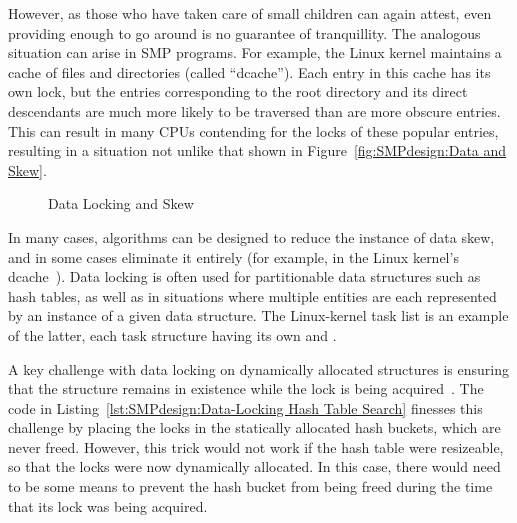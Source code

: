 However, as those who have taken care of small children can again attest,
even providing enough to go around is no guarantee of tranquillity.
The analogous situation can arise in SMP programs.
For example, the Linux kernel maintains a cache of files and directories
(called ``dcache'').
Each entry in this cache has its own lock, but the entries corresponding
to the root directory and its direct descendants are much more likely to
be traversed than are more obscure entries.
This can result in many CPUs contending for the locks of these popular
entries, resulting in a situation not unlike that
shown in Figure~\ref{fig:SMPdesign:Data and Skew}.

\begin{figure}
\centering
{}
\caption{Data Locking and Skew}
\end{figure}

In many cases, algorithms can be designed to reduce the instance of
data skew, and in some cases eliminate it entirely
(for example, in the Linux kernel's
dcache~\cite{McKenney04a,JonathanCorbet2010dcacheRCU,NeilBrown2015PathnameLookup,NeilBrown2015RCUwalk,NeilBrown2015PathnameSymlinks}).
Data locking is often used for partitionable data structures such as
hash tables, as well as in situations where multiple entities are each
represented by an instance of a given data structure.
The Linux-kernel task list is an example of the latter, each task
structure having its own  and .

A key challenge with data locking on dynamically allocated structures
is ensuring that the structure remains in existence while the lock is
being acquired~\cite{Gamsa99}.
The code in
Listing~\ref{lst:SMPdesign:Data-Locking Hash Table Search}
finesses this challenge by placing the locks in the statically allocated
hash buckets, which are never freed.
However, this trick would not work if the hash table were resizeable,
so that the locks were now dynamically allocated.
In this case, there would need to be some means to prevent the hash
bucket from being freed during the time that its lock was being acquired.

